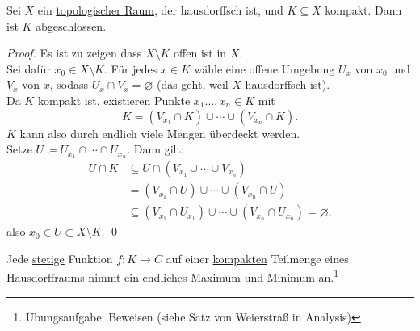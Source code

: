 \begin{lemma}
  Sei \( X \) ein \hyperref[def:topologie]{topologischer Raum}, der hausdorffsch ist, und \( K \subseteq X \) kompakt. Dann ist \( K \) abgeschlossen.
  \begin{proof}
    Es ist zu zeigen dass \( X \setminus K \) offen ist in \( X \). \\
    Sei dafür \( x_0 \in X \setminus K \). Für jedes \( x \in K \) wähle eine offene Umgebung \( U_x \) von \( x_0 \) und \( V_x \) von \( x \), sodass \( U_x \cap V_x = \varnothing \) (das geht, weil \( X \) hausdorffsch ist). \\
    Da \( K \) kompakt ist, existieren Punkte \( x_1 \dots, x_n \in K \) mit
    \begin{equation*}
      K = (V_{x_1} \cap K) \cup \cdots \cup (V_{x_n} \cap K)\text{.}
    \end{equation*}
    \( K \) kann also durch endlich viele Mengen überdeckt werden. \\
    Setze \( U \coloneqq U_{x_1} \cap \cdots \cap U_{x_n} \). Dann gilt:
    \begin{align*}
      U \cap K &\subseteq U \cap (V_{x_1} \cup \cdots \cup V_{x_n}) \\
       &= (V_{x_1} \cap U) \cup \cdots \cup (V_{x_n} \cap U) \\
       &\subseteq (V_{x_1} \cap U_{x_1}) \cup \cdots \cup (V_{x_n} \cap U_{x_n}) = \varnothing\text{,}
    \end{align*}
    also \( x_0 \in U \subset X \setminus K \). \qed{}
  \end{proof}
\end{lemma}

\begin{corollary}
  Jede \hyperref[def:stetig]{stetige} Funktion \( f : K \to C \) auf einer \hyperref[def:kompakt]{kompakten} Teilmenge eines \hyperref[def:hausdorffsch]{Hausdorffraums} nimmt ein endliches Maximum und Minimum an.\footnote{Übungsaufgabe: Beweisen (siehe Satz von Weierstraß in Analysis)}
\end{corollary}

